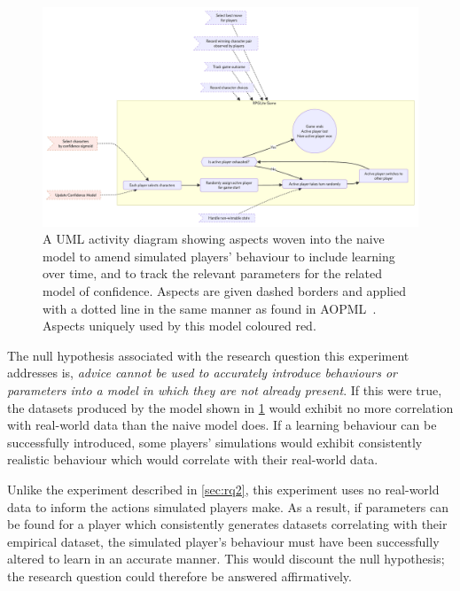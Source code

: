\begin{figure}[h]
  \centering
  \includegraphics[width=\columnwidth]{70_generality_of_aspects/diagrams/exp3_learning_model.pdf}
  \caption{A UML activity diagram showing aspects woven into the naive model to amend simulated players'
  behaviour to include learning over time, and to track the relevant parameters
  for the related model of confidence. Aspects are given dashed borders and
  applied with a dotted line in the same manner as found in
  AOPML~\cite{Cappelli_AOBPM}. Aspects uniquely used by this model
  coloured red.}
  \label{fig:learning_model_software_diagram}
\end{figure}

The null hypothesis associated with the research question this experiment
addresses is, \emph{advice cannot be used to accurately introduce behaviours or
parameters into a model in which they are not already present}. If this were
true, the datasets produced by the \aspectoriented model shown in
\cref{fig:learning_model_software_diagram} would exhibit no more correlation with
real-world data than the naive model does. If a learning behaviour can be
successfully introduced, some players' simulations would exhibit consistently
realistic behaviour which would correlate with their real-world data.

Unlike the experiment described in \cref{sec:rq2}, this experiment uses no
real-world data to inform the actions simulated players make. As a result, if
parameters can be found for a player which consistently generates datasets
correlating with their empirical dataset, the simulated player's behaviour must
have been successfully altered to learn in an accurate manner. This would
discount the null hypothesis; the research question could therefore be answered
affirmatively.




